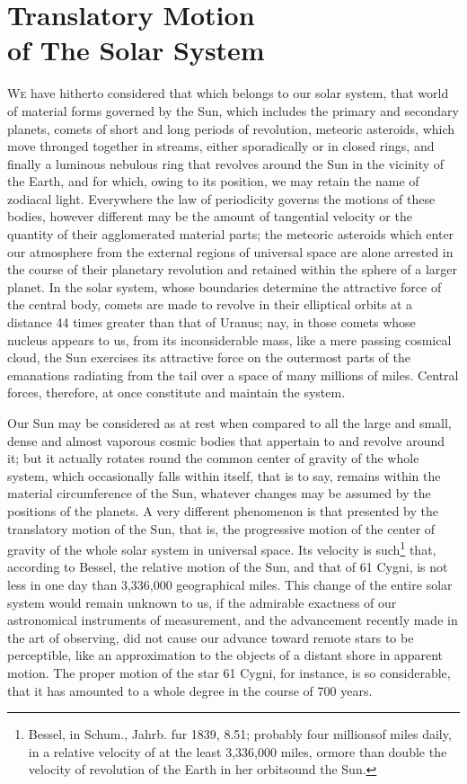 
\chapter[Translatory Motion of ...]{Translatory Motion\\of The Solar System}

\lettrine[lines=4]{\goudy W}{e} have hitherto considered that which belongs to our solar system, that world of material forms governed by the Sun, which includes the primary and secondary planets, comets of short and long periods of revolution, meteoric asteroids, which move thronged together in streams, either sporadically or in closed rings, and finally a luminous nebulous ring that revolves around the Sun in the vicinity of the Earth, and for which, owing to its position, we may retain the name of zodiacal light. Everywhere the law of periodicity governs the motions of these bodies, however different may be the amount of tangential velocity or the quantity of their agglomerated material parts; the meteoric asteroids which enter our atmosphere from the external regions of universal space are alone arrested in the course of their planetary revolution and retained within the sphere of a larger planet. In the solar system, whose boundaries determine the attractive force of the central body, comets are made to revolve in their elliptical orbits at a distance 44 times greater than that of Uranus; nay, in those comets whose nucleus appears to us, from its inconsiderable mass, like a mere passing cosmical cloud, the Sun exercises its attractive force on the outermost parts of the emanations radiating from the tail over a space of many millions of miles. Central forces, therefore, at once constitute and maintain the system.

Our Sun may be considered as at rest when compared to all the large and small, dense and almost vaporous cosmic bodies that appertain to and revolve around it; but it actually rotates round the common center of gravity of the whole system, which occasionally falls within itself, that is to say, remains within the material circumference of the Sun, whatever changes may be assumed by the positions of the planets. A very different phenomenon is that presented by the translatory motion of the Sun, that is, the progressive motion of the center of gravity of the whole solar system in universal space. Its velocity is such\footnote{Bessel, in Schum., Jahrb. fur 1839, 8.51; probably four millionsof miles daily, in a relative velocity of at the least 3,336,000 miles, ormore than double the velocity of revolution of the Earth in her orbitsound the Sun.} that, according to Bessel, the relative motion of the Sun, and that of 61 Cygni, is not less in one day than 3,336,000 geographical miles. This change of the entire solar system would remain unknown to us, if the admirable exactness of our astronomical instruments of measurement, and the advancement recently made in the art of observing, did not cause our advance toward remote stars to be perceptible, like an approximation to the objects of a distant shore in apparent motion. The proper motion of the star 61 Cygni, for instance, is so considerable, that it has amounted to a whole degree in the course of 700 years.

